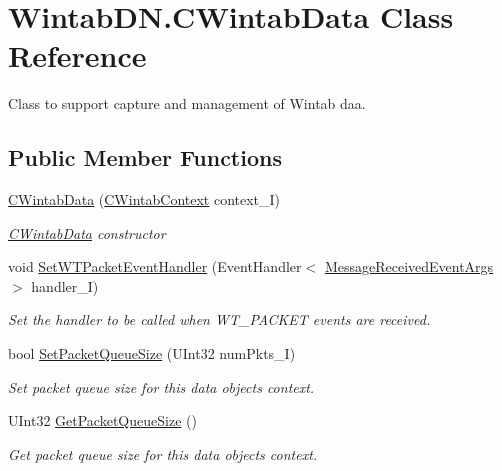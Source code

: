 \hypertarget{class_wintab_d_n_1_1_c_wintab_data}{}\section{Wintab\+D\+N.\+C\+Wintab\+Data Class Reference}
\label{class_wintab_d_n_1_1_c_wintab_data}


Class to support capture and management of Wintab daa.  


\subsection*{Public Member Functions}
\begin{DoxyCompactItemize}
\item 
\mbox{\hyperlink{class_wintab_d_n_1_1_c_wintab_data_a03c46068590647292be30a033ba68bcc}{C\+Wintab\+Data}} (\mbox{\hyperlink{class_wintab_d_n_1_1_c_wintab_context}{C\+Wintab\+Context}} context\+\_\+I)
\begin{DoxyCompactList}\small\item\em \mbox{\hyperlink{class_wintab_d_n_1_1_c_wintab_data}{C\+Wintab\+Data}} constructor \end{DoxyCompactList}\item 
void \mbox{\hyperlink{class_wintab_d_n_1_1_c_wintab_data_a986ef88b57d732ff3703a2c802fa62e7}{Set\+W\+T\+Packet\+Event\+Handler}} (Event\+Handler$<$ \mbox{\hyperlink{class_wintab_d_n_1_1_message_received_event_args}{Message\+Received\+Event\+Args}} $>$ handler\+\_\+I)
\begin{DoxyCompactList}\small\item\em Set the handler to be called when W\+T\+\_\+\+P\+A\+C\+K\+ET events are received. \end{DoxyCompactList}\item 
bool \mbox{\hyperlink{class_wintab_d_n_1_1_c_wintab_data_a3fc4761704097caa1e7378a0859db387}{Set\+Packet\+Queue\+Size}} (U\+Int32 num\+Pkts\+\_\+I)
\begin{DoxyCompactList}\small\item\em Set packet queue size for this data object\textquotesingle{}s context. \end{DoxyCompactList}\item 
U\+Int32 \mbox{\hyperlink{class_wintab_d_n_1_1_c_wintab_data_a2acbe7f86d6aafbf9b0b6e1f160b7ae3}{Get\+Packet\+Queue\+Size}} ()
\begin{DoxyCompactList}\small\item\em Get packet queue size for this data object\textquotesingle{}s context. \end{DoxyCompactList}\item 

\end{DoxyCompactItemize}
